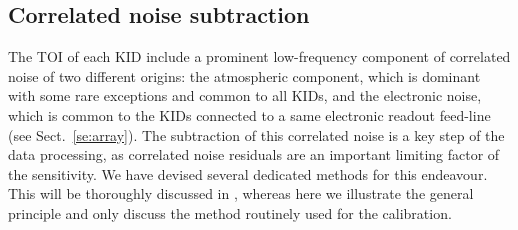 \subsection{Correlated noise subtraction}
\label{se:toi_proc}
The TOI of each KID include a prominent low-frequency component of correlated noise of two
different origins: the atmospheric component, which is dominant
{\lp with some rare exceptions} and common to all KIDs, and the electronic noise, which is common to the KIDs connected
to a same electronic readout feed-line (see
Sect.~\ref{se:array}). The subtraction of this correlated noise is a key
step of the data processing, as correlated noise residuals are an
important limiting factor of the sensitivity. We have devised several
dedicated methods for this endeavour. This will be thoroughly
discussed in \citet{Ponthieu2019}, whereas here we illustrate the
general principle and only discuss the method routinely used for
the calibration.

